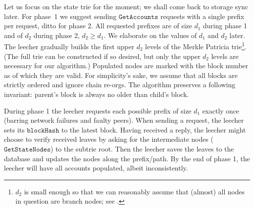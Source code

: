 \documentclass{amsart}
\begin{document}
Let us focus on the state trie for the moment; we shall come back to storage sync later.
For phase~1 we suggest sending $\texttt{GetAccounts}$ requests with a single prefix per request, ditto for phase 2.
All requested prefixes are of size $d_1$ during phase 1 and of $d_2$ during phase 2, $d_2 \geq d_1$.
We elaborate on the values of $d_1$ and $d_2$ later.
The leecher gradually builds the first upper $d_2$ levels of the Merkle Patricia trie\footnote{$d_2$
is small enough so that we can reasonably assume that (almost) all nodes in question are branch nodes;
see \cite{akhunov_1x_workshop_part2}.}.
(The full trie can be constructed if so desired, but only the upper $d_2$ levels are necessary for our algorithm.)
Populated nodes are marked with the block number as of which they are valid.
For simplicity's sake, we assume that all blocks are strictly ordered and ignore chain re-orgs.
The algorithm preserves a following invariant: parent's block is always no older than child's block.

During phase 1 the leecher requests each possible prefix of size $d_1$ exactly once
(barring network failures and faulty peers).
When sending a request,
the leecher sets its $\texttt{blockHash}$ to the latest block.
Having received a reply,
the leecher might choose to verify received leaves by asking for the intermediate nodes ($\texttt{GetStateNodes}$) to the subtrie root.
Then the leecher saves the leaves to the database and updates the nodes along the prefix/path.
By the end of phase 1, the leecher will have all accounts populated, albeit inconsistently.
\end{document}
